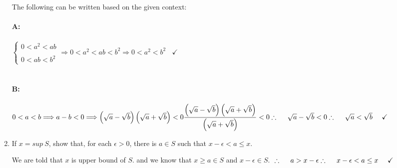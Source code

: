 \documentclass[fleqn]{article}
\begin{document}
\begin{enumerate}
      \textcolor{hwColor}{
        The following can be written based on the given context:
        \\
        \\
        \textbf{A:}
        \\
        \\
        $
          \begin{cases}
            0<a^2<ab
            \\
            \\
            0<ab<b^2  
          \end{cases} \Longrightarrow 0<a^2<ab<b^2 \Longrightarrow 0<a^2<b^2 ~~~~ \checkmark
        $
        \\
        \\
        \\
        \textbf{B:}
        \\
        \\
        $
          0<a<b \Longrightarrow a-b<0 \Longrightarrow \left(\sqrt{a}-\sqrt{b}\right)\left(\sqrt{a}+\sqrt{b}\right)<0
          \\
          \\
          \\
          \dfrac{\left(\sqrt{a}-\sqrt{b}\right)\left(\sqrt{a}+\sqrt{b}\right)}{\left(\sqrt{a}+\sqrt{b}\right)}<0
          \\
          \\
          \\
          \therefore ~~~~ \sqrt{a}-\sqrt{b}<0
          \\
          \\
          \\
          \therefore ~~~~ \sqrt{a}<\sqrt{b} ~~~~ \checkmark
        $
      }

    \item If $x=sup ~ S$, show that, for each $\epsilon > 0$, there is $a \in S$ such that
    $x-\epsilon < a \leq x$.

      \textcolor{hwColor}{
        We are told that $x$ is upper bound of $S$. and we know that $x \geq a \in S$ and $x-\epsilon \in S$.
        $
          \\
          \\
          \\
          \therefore ~~~~ a>x-\epsilon
          \\
          \\
          \\
          \therefore ~~~~ x-\epsilon <a \leq x ~~~~ \checkmark
        $
      }

  \end{enumerate}
\end{document}
